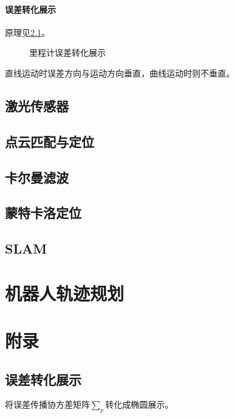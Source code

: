 \documentclass[
12pt, %
a4paper, 
oneside, %
headinclude,footinclude, %
]{scrartcl}
\begin{document}
\paragraph{误差转化展示}
原理见\ref{sec:error}。

\begin{figure}[H]
\centering
{} \quad
{}
\caption[里程计误差转化展示]{里程计误差转化展示}
\end{figure}

直线运动时误差方向与运动方向垂直，曲线运动时则不垂直。
\subsection[激光传感器]{激光传感器}
\subsection[点云匹配与定位]{点云匹配与定位}
\subsection[卡尔曼滤波]{卡尔曼滤波}
\subsection[蒙特卡洛定位]{蒙特卡洛定位}
\subsection[SLAM]{SLAM}
\section{机器人轨迹规划}
\section{附录}
\subsection[误差转化展示]{误差转化展示}\label{sec:error}
将误差传播协方差矩阵$ \sum_p $转化成椭圆展示。
\end{document}
